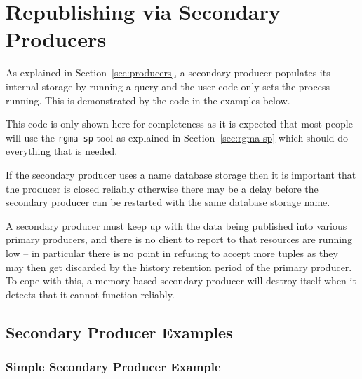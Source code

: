 \section{Republishing via Secondary Producers}
As explained in Section~\ref{sec:producers}, a secondary producer
populates its internal storage by running a query and the user code
only sets the process running. This is demonstrated by the code in the
examples below.

This code is only shown here for completeness as it is expected that most people
will use the \texttt{rgma-sp} tool as explained in
Section~\ref{sec:rgma-sp} which should do everything that is needed.

If the secondary producer uses a name database storage then it is important
that the producer is closed reliably otherwise there may be a delay before the
secondary producer can be restarted with the same database storage name.

A secondary producer must keep up with the data being published into
various primary producers, and there is no client to report to that
resources are running low {--} in particular there is no point in
refusing to accept more tuples as they may then get discarded by the
history retention period of the primary producer. To cope with this, a
memory based secondary producer will destroy itself when it detects
that it cannot function reliably.

\subsection{Secondary Producer Examples}
\subsubsection{Simple Secondary Producer Example}
